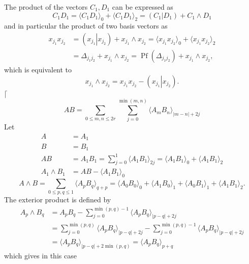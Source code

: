 \documentclass[aps, preprint]{revtex4}
\begin{document}
The product of the vectors $C_{1} ,D_{1}$ can be expressed as
\begin{equation}C_{1} D_{1} = \langle C_{1} D_{1} \rangle _{0} + \langle C_{1} D_{1} \rangle _{2} =(C_{1}\vert D_{1}) +C_{1} \wedge D_{1}
\end{equation}and in particular the product of two basis vectors as
\begin{align}x_{j_{1}} x_{j_{2}} &  =\left (x_{j_{1}}\left \vert x_{j_{2}}\right .\right ) +x_{j_{1}} \wedge x_{j_{2}} = \langle x_{j_{1}} x_{j_{2}} \rangle _{0} + \langle x_{j_{1}} x_{j_{2}} \rangle _{2} \\
 &  = \Delta _{j_{1} j_{2}} +x_{j_{1}} \wedge x_{j_{2}} =\ensuremath{\operatorname*{Pf}} \left ( \Delta _{j_{1} j_{2}}\right ) +x_{j_{1}} \wedge x_{j_{2}}\text{,}\end{align}which is equivalent to
\begin{equation}x_{j_{1}} \wedge x_{j_{2}} =x_{j_{1}} x_{j_{2}} -\left (x_{j_{1}}\left \vert x_{j_{2}}\right .\right )\text{.}
\end{equation}$\lceil $
\begin{equation}A B =\sum _{0 \leq m ,n \leq 2 r}\sum _{j =0}^{\min \left (m ,n\right )} \langle A_{m} B_{n} \rangle _{\left \vert m -n\right \vert  +2 j}
\end{equation}Let
\begin{align}A &  =A_{1} \\
B &  =B_{1} \\
A B &  =A_{1} B_{1} =\sum _{j =0}^{1} \langle A_{1} B_{1} \rangle _{2 j} = \langle A_{1} B_{1} \rangle _{0} + \langle A_{1} B_{1} \rangle _{2} \\
A_{1} \wedge B_{1} &  =A B - \langle A_{1} B_{1} \rangle _{0}\end{align}
\begin{equation}A \wedge B =\sum _{0 \leq p ,q \leq 1} \langle A_{p} B_{q} \rangle _{q +p} = \langle A_{0} B_{0} \rangle _{0} + \langle A_{1} B_{0} \rangle _{1} + \langle A_{0} B_{1} \rangle _{1} + \langle A_{1} B_{1} \rangle _{2}\text{.}
\end{equation}The exterior product is defined by
\begin{align}A_{p} \wedge B_{q} &  =A_{p} B_{q} -\sum _{j =0}^{\min \left (p ,q\right ) -1} \langle A_{p} B_{q} \rangle _{\left \vert p -q\right \vert  +2 j} \\
 &  =\sum _{j =0}^{\min \left (p ,q\right )} \langle A_{p} B_{q} \rangle _{\left \vert p -q\right \vert  +2 j} -\sum _{j =0}^{\min \left (p ,q\right ) -1} \langle A_{p} B_{q} \rangle _{\left \vert p -q\right \vert  +2 j} \\
 &  = \langle A_{p} B_{q} \rangle _{\left \vert p -q\right \vert  +2 \min \left (p ,q\right )} = \langle A_{p} B_{q} \rangle _{p +q}\end{align}which gives in this case
\end{document}
